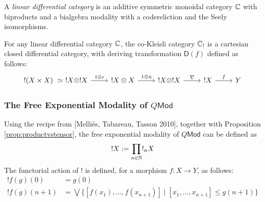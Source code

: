 \begin{definition}
A \emph{linear differential category} is an additive symmetric monoidal category $\mathbb{C}$ with biproducts and a bialgebra modality with a codereliction and the Seely isomorphisms.
\end{definition}


\begin{theorem}
For any linear differential category $\mathbb{C}$, the co-Kleisli category $\mathbb{C}_{!}$ is a cartesian closed differential category, with deriving transformation $\mathsf{D}(f)$ defined as follows:
$$
\begin{tikzcd}
!(X\times X)\  \simeq\  !X\otimes !X 
\ar{r}{1\otimes \epsilon}  & !X\otimes X \ar{r}{1\otimes \eta}&
!X\otimes !X \ar{r}{\nabla}& !X \ar{r}{f} & Y
\end{tikzcd}
$$
\end{theorem}


\subsubsection{The Free Exponential Modality of $Q\mathsf{Mod}$}


Using the recipe from [Melli\'es, Tabareau, Tasson 2010], together with Proposition \ref{prop:productvstensor}, the free exponential modality of $Q\mathsf{Mod}$ can be defined as
$$
! X:= \prod_{n\in \mathbb{N}}!_{n}X
$$
The functorial action of $!$ is defined, for a morphism $f: X\to Y$, as follows:
\begin{align*}
!f(g)(0) & = g(0) \\
!f (g)(n+1)   & = \bigvee\Big \{
[f(x_{1}),\dots, f(x_{n+1})] \mid [x_{1}, \dots, x_{n+1}]\leq g(n+1)\Big \}
\end{align*}




